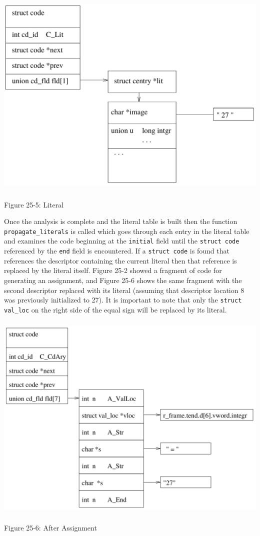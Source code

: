 \begin{center}
\includegraphics[width=6.0in,height=4.0in]{struct_code_literal.png}

Figure 25-5: Literal
\end{center}


Once the analysis is complete and the literal table is built then the
function \texttt{propagate\_literals} is called which goes through
each entry in the literal table and examines the code beginning at the
\texttt{initial} field until the \texttt{struct code} referenced by
the \texttt{end} field is encountered. If a \texttt{struct code} is
found that references the descriptor containing the current literal
then that reference is replaced by the literal itself. Figure 25-2
showed a fragment of code for generating an assignment, and Figure
25-6 shows the same fragment with the second descriptor replaced with
its literal (assuming that descriptor location 8 was previously
initialized to 27). It is important to note that only the
\texttt{struct val\_loc} on the right side of the equal sign will be
replaced by its literal.


\bigskip

\begin{center}
\includegraphics[width=6.0in,height=4.0in]{struct_code_assign_prop.png}

Figure 25-6: After Assignment
\end{center}



